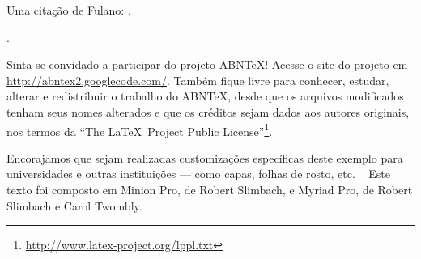 \documentclass[a5paper]{memoir}
\begin{document}
Uma citação de Fulano: .

\cite{fulano}.



\backmatter %
\cleardoublepage
\thispagestyle{empty} %

Sinta-se convidado a participar do projeto ABN\TeX! Acesse o site do projeto em
\url{http://abntex2.googlecode.com/}. Também fique livre para conhecer,
estudar, alterar e redistribuir o trabalho do ABN\TeX, desde que os arquivos
modificados tenham seus nomes alterados e que os créditos sejam dados aos
autores originais, nos termos da ``The \LaTeX\ Project Public
License''\footnote{\url{http://www.latex-project.org/lppl.txt}}.

Encorajamos que sejam realizadas customizações específicas deste exemplo para
universidades e outras instituições --- como capas, folhas de rosto, etc.
~\vfill
Este texto foi composto em Minion Pro, de Robert Slimbach, e Myriad Pro, de Robert Slimbach e Carol Twombly.
\end{document}
